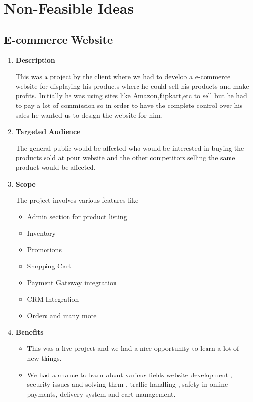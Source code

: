 \documentclass[fleqn,10pt]{../SelfArx} %
\begin{document}

\section{Non-Feasible Ideas}
\subsection{E-commerce Website}
\vspace{0.5cm}
\begin{enumerate}
\item \textbf{Description}

This was a project by the client where we had to develop a e-commerce website for displaying his products where he could sell his products and make profits. Initially he was using sites like Amazon,flipkart,etc to sell but he had to pay a lot of commission so in order to have the complete control over his sales he wanted us to design the website for him.

\item \textbf{Targeted Audience}

The general public would be affected who would be interested in buying the products sold at pour website and the other competitors selling the same product would be affected.

\item \textbf{Scope}

The project involves various features like
\begin{itemize}
    \item Admin section for product listing \item Inventory \item Promotions  \item Shopping Cart \item  Payment Gateway integration \item  CRM Integration \item  Orders and many more
\end{itemize}


 \item \textbf{Benefits}
 
\begin{itemize}

    \item This was a live project and we had a nice opportunity to learn a lot of new things.
    \item We had a chance to learn about various fields website development , security issues and solving them , traffic handling , safety in online payments, delivery system and cart management.


\end{itemize}
\end{enumerate}
\end{document}
